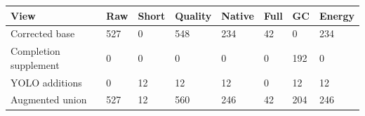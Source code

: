 \begin{tabular}{llllllll}
\hline
View & Raw & Short & Quality & Native & Full & GC & Energy \\
\hline
Corrected base & 527 & 0 & 548 & 234 & 42 & 0 & 234 \\
Completion supplement & 0 & 0 & 0 & 0 & 0 & 192 & 0 \\
YOLO additions & 0 & 12 & 12 & 12 & 0 & 12 & 12 \\
Augmented union & 527 & 12 & 560 & 246 & 42 & 204 & 246 \\
\hline
\end{tabular}
